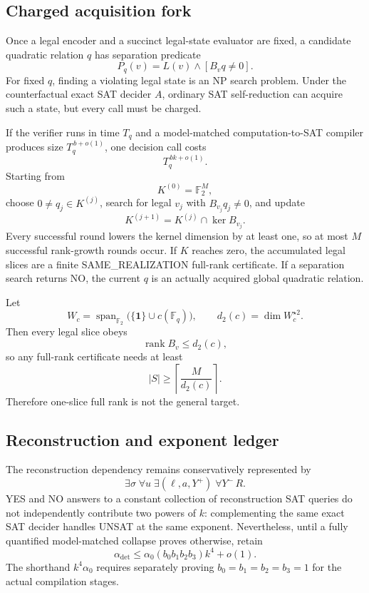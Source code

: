 \documentclass[11pt]{article}
\begin{document}
\subsection{Charged acquisition fork}

Once a legal encoder and a succinct legal-state evaluator are fixed, a
candidate quadratic relation \(q\) has separation predicate
\[
 P_q(v)=L(v)\wedge[B_vq\ne0].
\]
For fixed \(q\), finding a violating legal state is an NP search problem.
Under the counterfactual exact SAT decider \(A\), ordinary SAT
self-reduction can acquire such a state, but every call must be charged.

If the verifier runs in time \(T_q\) and a model-matched computation-to-SAT
compiler produces size \(T_q^{\,b+o(1)}\), one decision call costs
\[
 \boxed{T_q^{\,bk+o(1)}}.
\]
Starting from
\[
 K^{(0)}=\mathbb F_2^M,
\]
choose \(0\ne q_j\in K^{(j)}\), search for legal \(v_j\) with
\(B_{v_j}q_j\ne0\), and update
\[
 K^{(j+1)}=K^{(j)}\cap\ker B_{v_j}.
\]
Every successful round lowers the kernel dimension by at least one, so at
most \(M\) successful rank-growth rounds occur.  If \(K\) reaches zero, the
accumulated legal slices are a finite SAME\_REALIZATION full-rank
certificate.  If a separation search returns NO, the current \(q\) is an
actually acquired global quadratic relation.

Let
\[
 W_c=\operatorname{span}_{\mathbb F_2}
 \bigl(\{\mathbf1\}\cup c(\mathbb F_q)\bigr),
 \qquad
 d_2(c)=\dim W_c^{\star2}.
\]
Then every legal slice obeys
\[
 \operatorname{rank}B_v\le d_2(c),
\]
so any full-rank certificate needs at least
\[
 \boxed{|S|\ge\left\lceil\frac{M}{d_2(c)}\right\rceil}.
\]
Therefore one-slice full rank is not the general target.

\subsection{Reconstruction and exponent ledger}

The reconstruction dependency remains conservatively represented by
\[
 \boxed{\exists\sigma\;\forall u\;
 \exists(\ell,a,Y^+)\;\forall Y^-\,R}.
\]
YES and NO answers to a constant collection of reconstruction SAT queries
do not independently contribute two powers of \(k\): complementing the same
exact SAT decider handles UNSAT at the same exponent.  Nevertheless, until
a fully quantified model-matched collapse proves otherwise, retain
\[
 \boxed{\alpha_{\mathrm{det}}
 \le
 \alpha_0(b_0b_1b_2b_3)k^4+o(1)}.
\]
The shorthand \(k^4\alpha_0\) requires separately proving
\(b_0=b_1=b_2=b_3=1\) for the actual compilation stages.
\end{document}
